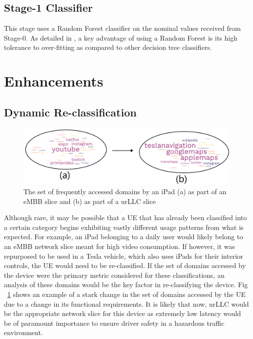 \documentclass[conference]{IEEEtran}
\begin{document}
\subsection{Stage-1 Classifier}

This stage uses a Random Forest classifier on the nominal values received from Stage-0. As detailed in \cite{b4}, a key advantage of using a Random Forest is its high tolerance to over-fitting as compared to other decision tree classifiers.


\section{Enhancements}
\subsection{Dynamic Re-classification}
\begin{figure}[htbp]
\centerline{\includegraphics[scale=0.3]{fig3.png}}
\caption{The set of frequently accessed domains by an iPad (a) as part of an eMBB slice and (b) as part of a urLLC slice}
\label{wordcloud}
\end{figure}
Although rare, it may be possible that a UE that has already been classified into a certain category begins exhibiting vastly different usage patterns from what is expected. For example, an iPad belonging to a daily user would likely belong to an eMBB network slice meant for high video consumption. If however, it was repurposed to be used in a Tesla vehicle, which also uses iPads for their interior controls, the UE would need to be re-classified. If the set of domains accessed by the device were the primary metric considered for these classifications, an analysis of these domains would be the key factor in re-classifying the device.  Fig ~\ref{wordcloud} shows an example of a stark change in the set of domains accessed by the UE due to a change in its functional requirements. It is likely that now, urLLC would be the appropriate network slice for this device as extremely low latency would be of paramount importance to ensure driver safety in a hazardous traffic environment.
\end{document}
